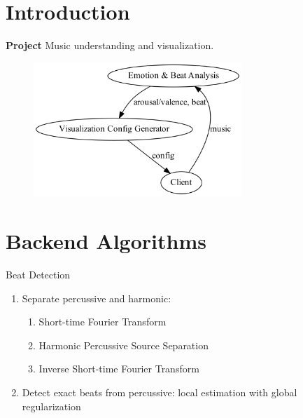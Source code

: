 
\section{Introduction}
\begin{frame}
\begin{exampleblock}{\textbf{Project}}
Music understanding and visualization.
\end{exampleblock}

\begin{figure}[H]
  \centering
  \includegraphics[width=0.7\textwidth]{res/illu.dot.png}
\end{figure}


\end{frame}

\section{Backend Algorithms}
\begin{frame}{Beat Detection}
\begin{enumerate}
    \item Separate percussive and harmonic:
      \begin{enumerate}
        \item Short-time Fourier Transform
        \item Harmonic Percussive Source Separation
        \item Inverse Short-time Fourier Transform
      \end{enumerate}
    \item Detect exact beats from percussive: local estimation with global regularization
  \end{enumerate}
\end{frame}

